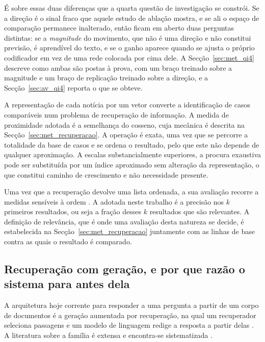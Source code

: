 É sobre essas duas diferenças que a quarta questão de investigação se constrói. Se a direção é
o sinal fraco que aquele estudo de ablação mostra, e se ali o espaço de comparação permanece
inalterado, então ficam em aberto duas perguntas distintas: se a \emph{magnitude} do movimento,
que não é uma direção e não constitui previsão, é aprendível do texto, e se o ganho
aparece quando se ajusta o próprio codificador em vez de uma rede colocada por cima dele. A
Secção~\ref{sec:met_qi4} descreve como ambas são postas à prova, com um braço treinado sobre a
magnitude e um braço de replicação treinado sobre a direção, e a Secção~\ref{sec:av_qi4}
reporta o que se obteve.

A representação de cada notícia por um vetor converte a identificação de casos comparáveis num
problema de recuperação de informação. A medida de proximidade adotada é a semelhança do cosseno,
cuja mecânica é descrita na Secção~\ref{sec:met_recuperacao}. A operação é exata, uma vez que se
percorre a totalidade da base de casos e se ordena o resultado, pelo que este não depende de
qualquer aproximação. A escalas substancialmente superiores, a procura exaustiva pode ser
substituída por um índice aproximado \autocite{johnson2021faiss} sem alteração da representação, o
que constitui caminho de crescimento e não necessidade presente.

Uma vez que a recuperação devolve uma lista ordenada, a sua avaliação recorre a medidas sensíveis à
ordem \autocite{manning2008ir}. A adotada neste trabalho é a precisão nos $k$ primeiros resultados,
ou seja a fração desses $k$ resultados que são relevantes. A definição de relevância, que é onde uma
avaliação desta natureza se decide, é estabelecida na Secção~\ref{sec:met_recuperacao} juntamente
com as linhas de base contra as quais o resultado é comparado.

\subsection{Recuperação com geração, e por que razão o sistema para antes dela}
\label{sec:ctx_rag}

A arquitetura hoje corrente para responder a uma pergunta a partir de um corpo de documentos é a
geração aumentada por recuperação, na qual um recuperador seleciona passagens e um modelo de
linguagem redige a resposta a partir delas \autocite{lewis2020rag}. A literatura sobre a família é
extensa e encontra-se sistematizada \autocite{huang2026ragsurvey}.


